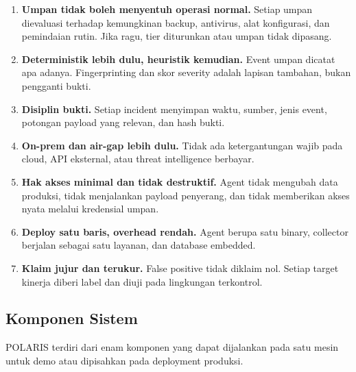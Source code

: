 \documentclass[12pt,a4paper]{article}
\begin{document}
\begin{enumerate}[leftmargin=1.2cm,itemsep=2pt,topsep=2pt]
  \item \textbf{Umpan tidak boleh menyentuh operasi normal.} Setiap umpan dievaluasi terhadap kemungkinan backup, antivirus, alat konfigurasi, dan pemindaian rutin. Jika ragu, tier diturunkan atau umpan tidak dipasang.
  \item \textbf{Deterministik lebih dulu, heuristik kemudian.} Event umpan dicatat apa adanya. Fingerprinting dan skor severity adalah lapisan tambahan, bukan pengganti bukti.
  \item \textbf{Disiplin bukti.} Setiap incident menyimpan waktu, sumber, jenis event, potongan payload yang relevan, dan hash bukti.
  \item \textbf{On-prem dan air-gap lebih dulu.} Tidak ada ketergantungan wajib pada cloud, API eksternal, atau threat intelligence berbayar.
  \item \textbf{Hak akses minimal dan tidak destruktif.} Agent tidak mengubah data produksi, tidak menjalankan payload penyerang, dan tidak memberikan akses nyata melalui kredensial umpan.
  \item \textbf{Deploy satu baris, overhead rendah.} Agent berupa satu binary, collector berjalan sebagai satu layanan, dan database embedded.
  \item \textbf{Klaim jujur dan terukur.} False positive tidak diklaim nol. Setiap target kinerja diberi label dan diuji pada lingkungan terkontrol.
\end{enumerate}

\subsection{Komponen Sistem}

POLARIS terdiri dari enam komponen yang dapat dijalankan pada satu mesin untuk demo atau dipisahkan pada deployment produksi.
\end{document}
